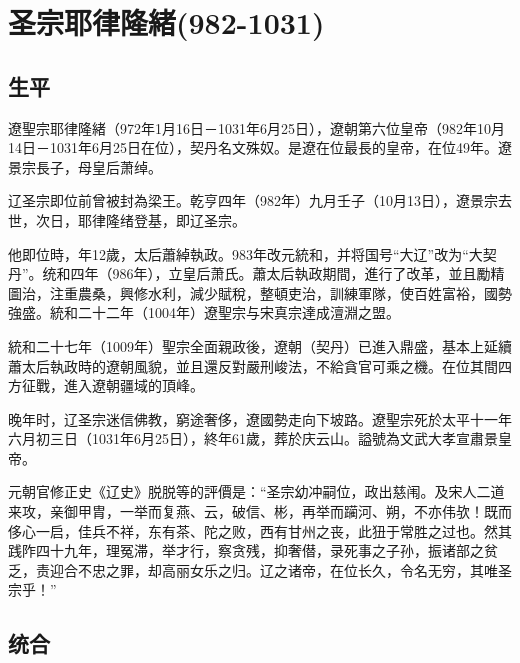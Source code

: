 
\section{圣宗耶律隆緒\tiny(982-1031)}

\subsection{生平}

遼聖宗耶律隆緒（972年1月16日－1031年6月25日），遼朝第六位皇帝（982年10月14日－1031年6月25日在位），契丹名文殊奴。是遼在位最長的皇帝，在位49年。遼景宗長子，母皇后萧绰。

辽圣宗即位前曾被封為梁王。乾亨四年（982年）九月壬子（10月13日），遼景宗去世，次日，耶律隆绪登基，即辽圣宗。

他即位時，年12歲，太后蕭綽執政。983年改元統和，并将国号“大辽”改为“大契丹”。统和四年（986年），立皇后萧氏。蕭太后執政期間，進行了改革，並且勵精圖治，注重農桑，興修水利，減少賦稅，整頓吏治，訓練軍隊，使百姓富裕，國勢強盛。統和二十二年（1004年）遼聖宗与宋真宗達成澶淵之盟。

統和二十七年（1009年）聖宗全面親政後，遼朝（契丹）已進入鼎盛，基本上延續蕭太后執政時的遼朝風貌，並且還反對嚴刑峻法，不給貪官可乘之機。在位其間四方征戰，進入遼朝疆域的頂峰。

晚年时，辽圣宗迷信佛教，窮途奢侈，遼國勢走向下坡路。遼聖宗死於太平十一年六月初三日（1031年6月25日），終年61歲，葬於庆云山。謚號為文武大孝宣肅景皇帝。

元朝官修正史《辽史》脱脱等的評價是：“圣宗幼冲嗣位，政出慈闱。及宋人二道来攻，亲御甲胄，一举而复燕、云，破信、彬，再举而躏河、朔，不亦伟欤！既而侈心一启，佳兵不祥，东有茶、陀之败，西有甘州之丧，此狃于常胜之过也。然其践阼四十九年，理冤滞，举才行，察贪残，抑奢僣，录死事之子孙，振诸部之贫乏，责迎合不忠之罪，却高丽女乐之归。辽之诸帝，在位长久，令名无穷，其唯圣宗乎！”

\subsection{统合}

